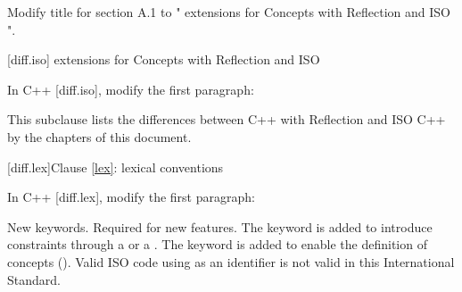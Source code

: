 \setcounter{chapter}{0}

Modify title for section A.1 to "\Cpp{} extensions for Concepts with Reflection
and ISO \CppXIV{}".

\setcounter{section}{0}
[diff.iso]{\Cpp{} extensions for Concepts with Reflection and ISO \CppXIV{}}

In C++ [diff.iso], modify the first paragraph:

\begin{std.txt}
This subclause lists the differences between C++ with Reflection  and ISO C++ by the chapters of this document.
\end{std.txt}

[diff.lex]{Clause \ref{lex}: lexical conventions}

In C++ [diff.lex], modify the first paragraph:

\begin{std.txt}
\change New keywords.
\rationale Required for new features.
The  keyword is added
to introduce constraints through a  or
a . The  keyword is
added to enable the definition of concepts ().
\effect
Valid ISO \CppXVII{} code using \added{,} 
as an identifier is not valid in this International Standard.
\end{std.txt}
